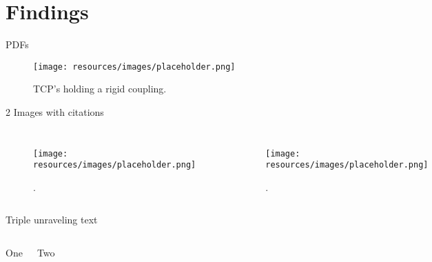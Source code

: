 \section{Findings}

\begin{frame}{PDFs}

    \begin{figure}[h]
        \centering
        \texttt{[image: resources/images/placeholder.png]}
        \captionsetup{labelformat=empty}
        \caption{TCP's holding a rigid coupling.}
    \end{figure}
    
\end{frame}

\begin{frame}{2 Images with citations}

    \begin{columns}
        \begin{figure}[h]
            \centering
            \texttt{[image: resources/images/placeholder.png]}
            \captionsetup{labelformat=empty}
            \caption{\citeauthor{fu_dual_2020}\cite{fu_dual_2020}.}
        \end{figure}

        \begin{figure}[h]
            \centering
            \texttt{[image: resources/images/placeholder.png]}
            \captionsetup{labelformat=empty}
            \caption{\citeauthor{khan_calibration_2016}\cite{khan_calibration_2016}.}
        \end{figure}
    \end{columns}
    
\end{frame}

\begin{frame}{Triple unraveling text}


    \begin{columns}

        \begin{center}
        {\Huge{} One\par}
        \end{center}

        \begin{center}
        {\Huge{} Two\par}
        \end{center}
    \end{columns}
        \vspace{\fill}


\end{frame}
